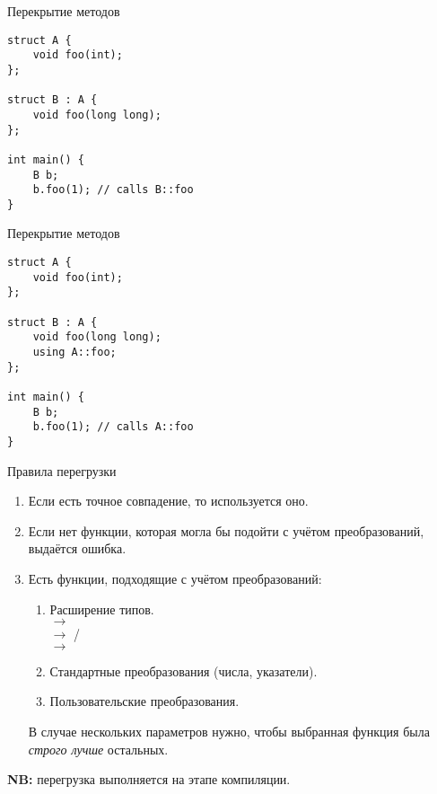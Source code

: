 \documentclass{beamer}
\begin{document}
\begin{frame}[fragile]{Перекрытие методов}
    \begin{lstlisting}
struct A {
    void foo(int);
};

struct B : A {
    void foo(long long);
};

int main() {
    B b;
    b.foo(1); // calls B::foo
}
    \end{lstlisting}
\end{frame}

\begin{frame}[fragile]{Перекрытие методов}
    \begin{lstlisting}
struct A {
    void foo(int);
};

struct B : A {
    void foo(long long);
    using A::foo;
};

int main() {
    B b;
    b.foo(1); // calls A::foo
}
    \end{lstlisting}
\end{frame}

\begin{frame}[fragile]{Правила перегрузки}
    \begin{enumerate}
        \item Если есть точное совпадение, то используется оно.

        \item Если нет функции, которая могла бы подойти с учётом преобразований,
            выдаётся ошибка.

        \item Есть функции, подходящие с учётом преобразований:

            \begin{enumerate}
                \item Расширение типов.\\
                     $\to$ \\
                     $\to$ /\\
                     $\to$ 

                \item Стандартные преобразования (числа, указатели).
                \item Пользовательские преобразования.
            \end{enumerate}
            В случае нескольких параметров нужно, чтобы выбранная функция была
            {\em строго лучше} остальных.
    \end{enumerate}
    {\bf NB:} перегрузка выполняется на этапе компиляции.
\end{frame}
\end{document}
